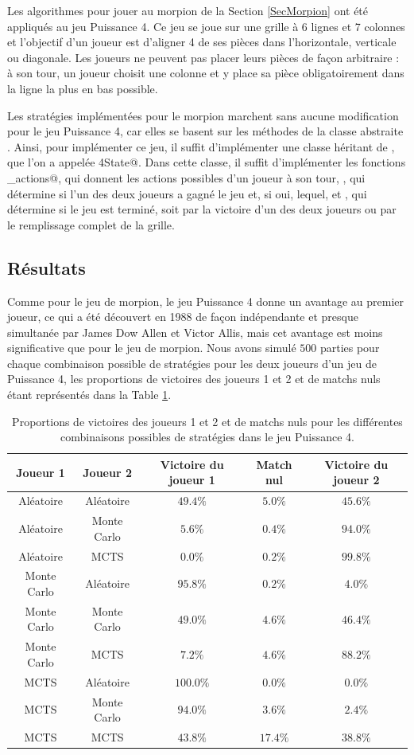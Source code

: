 \documentclass[a4paper,11pt]{article}
\begin{document}
Les algorithmes pour jouer au morpion de la Section \ref{SecMorpion} ont été appliqués au jeu Puissance 4. Ce jeu se joue sur une grille à 6 lignes et 7 colonnes et l'objectif d'un joueur est d'aligner 4 de ses pièces dans l'horizontale, verticale ou diagonale. Les joueurs ne peuvent pas placer leurs pièces de façon arbitraire : à son tour, un joueur choisit une colonne et y place sa pièce obligatoirement dans la ligne la plus en bas possible.

Les stratégies implémentées pour le morpion marchent sans aucune modification pour le jeu Puissance 4, car elles se basent sur les méthodes de la classe abstraite \verb@State@. Ainsi, pour implémenter ce jeu, il suffit d'implémenter une classe héritant de \verb@State@, que l'on a appelée \verb@Puissance4State@. Dans cette classe, il suffit d'implémenter les fonctions \verb@get_actions@, qui donnent les actions possibles d'un joueur à son tour, \verb@win@, qui détermine si l'un des deux joueurs a gagné le jeu et, si oui, lequel, et \verb@stop@, qui détermine si le jeu est terminé, soit par la victoire d'un des deux joueurs ou par le remplissage complet de la grille.

\subsection{Résultats}

Comme pour le jeu de morpion, le jeu Puissance 4 donne un avantage au premier joueur, ce qui a été découvert en 1988 de façon indépendante et presque simultanée par James Dow Allen et Victor Allis, mais cet avantage est moins significative que pour le jeu de morpion. Nous avons simulé $500$ parties pour chaque combinaison possible de stratégies pour les deux joueurs d'un jeu de Puissance 4, les proportions de victoires des joueurs 1 et 2 et de matchs nuls étant représentés dans la Table \ref{TabP4}.

\begin{table}[ht]
\centering
\begin{tabular}{cc|ccc}
\hline\hline
Joueur 1 & Joueur 2 & Victoire du joueur 1 & Match nul & Victoire du joueur 2 \tabularnewline
\hline
Aléatoire & Aléatoire &     $49.4\%$ & $5.0\%$ & $45.6\%$ \tabularnewline
Aléatoire & Monte Carlo &   $5.6\%$ & $0.4\%$ & $94.0\%$ \tabularnewline
Aléatoire & MCTS &          $0.0\%$ & $0.2\%$ & $99.8\%$ \tabularnewline
Monte Carlo & Aléatoire &   $95.8\%$ & $0.2\%$ & $4.0\%$ \tabularnewline
Monte Carlo & Monte Carlo & $49.0\%$ & $4.6\%$ & $46.4\%$ \tabularnewline
Monte Carlo & MCTS &        $7.2\%$ & $4.6\%$ & $88.2\%$ \tabularnewline
MCTS & Aléatoire &          $100.0\%$ & $0.0\%$ & $0.0\%$ \tabularnewline
MCTS & Monte Carlo &        $94.0\%$ & $3.6\%$ & $2.4\%$ \tabularnewline
MCTS & MCTS &               $43.8\%$ & $17.4\%$ & $38.8\%$ \tabularnewline
\hline\hline
\end{tabular}
\caption{Proportions de victoires des joueurs 1 et 2 et de matchs nuls pour les différentes combinaisons possibles de stratégies dans le jeu Puissance 4.}
\label{TabP4}
\end{table}
\end{document}
